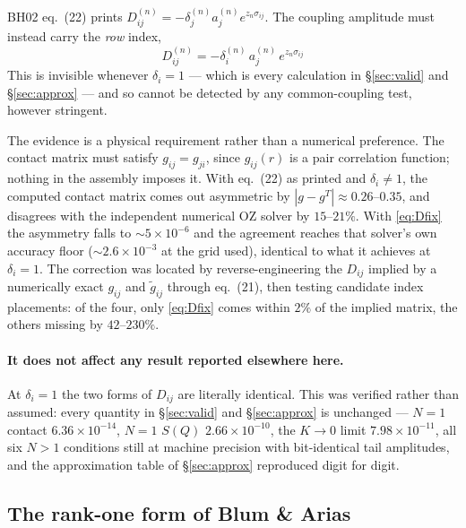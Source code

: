 \documentclass[11pt,a4paper]{article}
\newcommand{\eqBH}[1]{eq.~(#1)}
\begin{document}
BH02 \eqBH{22} prints $D^{(n)}_{ij}=-\delta^{(n)}_j a^{(n)}_j e^{z_n\sigma_{ij}}$.
The coupling amplitude must instead carry the \emph{row} index,
\begin{equation}
  \boxed{\;D^{(n)}_{ij}=-\delta^{(n)}_i\,a^{(n)}_j\,e^{z_n\sigma_{ij}}\;}
  \label{eq:Dfix}
\end{equation}
This is invisible whenever $\delta_i=1$ --- which is every calculation in
\S\ref{sec:valid} and \S\ref{sec:approx} --- and so cannot be detected by any
common-coupling test, however stringent.

The evidence is a physical requirement rather than a numerical preference. The
contact matrix must satisfy $g_{ij}=g_{ji}$, since $g_{ij}(r)$ is a pair
correlation function; nothing in the assembly imposes it. With \eqBH{22} as
printed and $\delta_i\neq1$, the computed contact matrix comes out asymmetric
by $|g-g^{T}|\approx0.26$--$0.35$, and disagrees with the independent numerical
OZ solver by $15$--$21\%$. With \eqref{eq:Dfix} the asymmetry falls to
$\sim5\times10^{-6}$ and the agreement reaches that solver's own accuracy floor
($\sim2.6\times10^{-3}$ at the grid used), identical to what it achieves at
$\delta_i=1$. The correction was located by reverse-engineering the $D_{ij}$
implied by a numerically exact $g_{ij}$ and $\tilde g_{ij}$ through \eqBH{21},
then testing candidate index placements: of the four, only \eqref{eq:Dfix}
comes within $2\%$ of the implied matrix, the others missing by $42$--$230\%$.

\paragraph{It does not affect any result reported elsewhere here.} At
$\delta_i=1$ the two forms of $D_{ij}$ are literally identical. This was
verified rather than assumed: every quantity in \S\ref{sec:valid} and
\S\ref{sec:approx} is unchanged --- $N=1$ contact $6.36\times10^{-14}$,
$N=1$ $S(Q)$ $2.66\times10^{-10}$, the $K\to0$ limit $7.98\times10^{-11}$, all
six $N>1$ conditions still at machine precision with bit-identical tail
amplitudes, and the approximation table of \S\ref{sec:approx} reproduced digit
for digit.

\subsection{The rank-one form of Blum \& Arias}
\label{sec:rankone}
\end{document}
